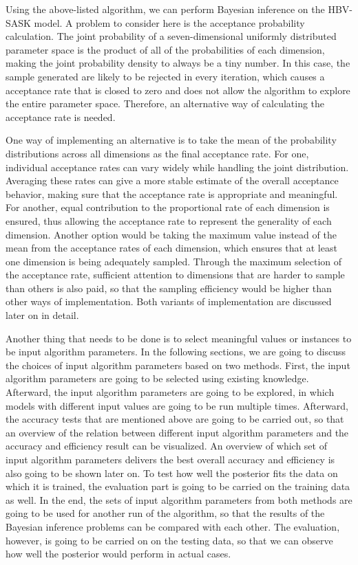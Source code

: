 Using the above-listed algorithm, we can perform Bayesian inference on the HBV-SASK model. A problem to consider here is the acceptance probability calculation. The joint probability of a seven-dimensional uniformly distributed parameter space is the product of all of the probabilities of each dimension, making the joint probability density to always be a tiny number. In this case, the sample generated are likely to be rejected in every iteration, which causes a acceptance rate that is closed to zero and does not allow the algorithm to explore the entire parameter space. Therefore, an alternative way of calculating the acceptance rate is needed. 

One way of implementing an alternative is to take the mean of the probability distributions across all dimensions as the final acceptance rate. For one, individual acceptance rates can vary widely while handling the joint distribution. Averaging these rates can give a more stable estimate of the overall acceptance behavior, making sure that the acceptance rate is appropriate and meaningful. For another, equal contribution to the proportional rate of each dimension is ensured, thus allowing the acceptance rate to represent the generality of each dimension. Another option would be taking the maximum value instead of the mean from the acceptance rates of each dimension, which ensures that at least one dimension is being adequately sampled. Through the maximum selection of the acceptance rate, sufficient attention to dimensions that are harder to sample than others is also paid, so that the sampling efficiency would be higher than other ways of implementation. Both variants of implementation are discussed later on in detail.

Another thing that needs to be done is to select meaningful values or instances to be input algorithm parameters. In the following sections, we are going to discuss the choices of input algorithm parameters based on two methods. First, the input algorithm parameters are going to be selected using existing knowledge. Afterward, the input algorithm parameters are going to be explored, in which models with different input values are going to be run multiple times. Afterward, the accuracy tests that are mentioned above are going to be carried out, so that an overview of the relation between different input algorithm parameters and the accuracy and efficiency result can be visualized. An overview of which set of input algorithm parameters delivers the best overall accuracy and efficiency is also going to be shown later on. To test how well the posterior fits the data on which it is trained, the evaluation part is going to be carried on the training data as well. In the end, the sets of input algorithm parameters from both methods are going to be used for another run of the algorithm, so that the results of the Bayesian inference problems can be compared with each other. The evaluation, however, is going to be carried on on the testing data, so that we can observe how well the posterior would perform in actual cases.

